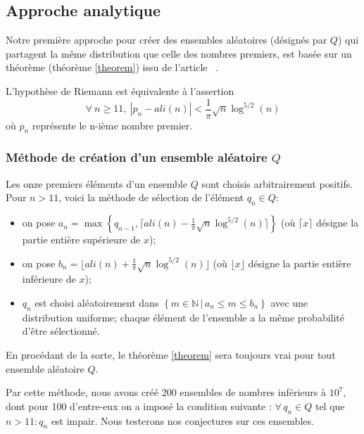 \documentclass[../main.tex]{report}
\begin{document}

\subsection{Approche analytique}
\label{sec:analytique}

Notre première approche pour créer des ensembles aléatoires (désignés par $Q$) qui partagent la même distribution que celle des nombres premiers, est basée sur un théorème (théorème \ref{theorem}) issu de l'article~\cite{article_prof} . 

\begin{Thm}
\label{theorem}
	L'hypothèse de Riemann est équivalente à l'assertion 
	\[
	\forall \ n \geqslant 11, \ |p_{n} - ali(n) | < \frac{1}{\pi} \sqrt{n} \log^{5/2}(n) 
	\]
	où $p_{n}$ représente le n-ième nombre premier.
\end{Thm}

\subsubsection{Méthode de création d'un ensemble aléatoire $Q$}

Les onze premiers éléments d'un ensemble $Q$ sont choisis arbitrairement positifs. 
Pour $ n > 11 $, voici la méthode de sélection  de l'élément $q_{n} \in Q$: 
\begin{itemize}
	\item on pose $ a_{n} = \max \left\{ q_{n-1} ,\lceil{ali(n) - \frac{1}{\pi} \sqrt{n} \log^{5/2}(n) \rceil} \right\}$ 
	(où $\lceil x \rceil$ désigne la partie entière supérieure de $x$);
	\item on pose $ b_{n} = \lfloor ali(n) + \frac{1}{\pi} \sqrt{n} \log^{5/2}(n) \rfloor $
	(où $\lfloor x \rfloor$ désigne la partie entière inférieure de $x$);
	\item $ q_{n} $ est choisi aléatoirement dans $ \left\{ m \in \mathbb{N} \, | \, a_{n} \leqslant m \leqslant b_{n} \right\}$ avec une distribution uniforme; chaque élément de l'ensemble a la même probabilité d'être sélectionné. 
\end{itemize}

En procédant de la sorte, le théorème \ref{theorem} sera toujours vrai pour tout ensemble aléatoire $Q$.

Par cette méthode, nous avons créé 200 ensembles de nombres inférieurs à $10^{7}$, dont pour 100 d'entre-eux on a imposé la condition suivante : $\forall \, q_{n} \in Q$ tel que  $n > 11 : q_{n}$ est impair. Nous testerons nos conjectures sur ces ensembles.
\end{document}
